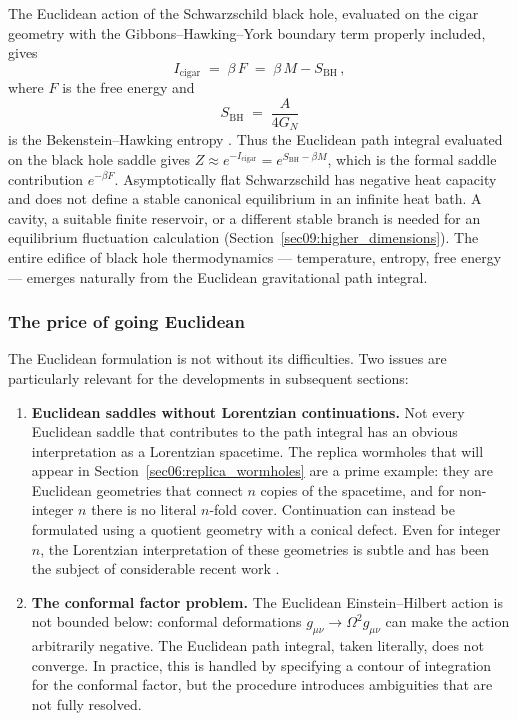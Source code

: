 \documentclass[11pt,letterpaper]{article}
\theoremstyle{plain}
\theoremstyle{definition}
\theoremstyle{remark}
\begin{document}
The Euclidean action of the Schwarzschild black hole, evaluated on the cigar
geometry with the Gibbons--Hawking--York boundary term properly included, gives
\citep{gibbonshawking1977}
\begin{equation}\label{eq05:euclidean_action_bh}
  I_{\mathrm{cigar}} \;=\; \beta\, F \;=\; \beta\, M - S_{\mathrm{BH}}\,,
\end{equation}
where $F$ is the free energy and
\begin{equation}\label{eq05:bh_entropy_from_action}
  S_{\mathrm{BH}} \;=\; \frac{A}{4G_N}
\end{equation}
is the Bekenstein--Hawking entropy \citep{bekenstein1973, hawking1975}.  Thus the
Euclidean path integral evaluated on the black hole saddle gives
$Z \approx e^{-I_{\mathrm{cigar}}} = e^{S_{\mathrm{BH}} - \beta M}$, which is
the formal saddle contribution $e^{-\beta F}$. Asymptotically flat
Schwarzschild has negative heat capacity and does not define a stable
canonical equilibrium in an infinite heat bath. A cavity, a suitable
finite reservoir, or a different stable branch is needed for an equilibrium
fluctuation calculation (Section~\ref{sec09:higher_dimensions}).  The entire edifice of black hole thermodynamics ---
temperature, entropy, free energy --- emerges naturally from the Euclidean
gravitational path integral.

\subsubsection*{The price of going Euclidean}

The Euclidean formulation is not without its difficulties.  Two issues are
particularly relevant for the developments in subsequent sections:

\begin{enumerate}
  \item \textbf{Euclidean saddles without Lorentzian continuations.}  Not every
    Euclidean saddle that contributes to the path integral has an obvious
    interpretation as a Lorentzian spacetime.  The replica wormholes that will
    appear in Section~\ref{sec06:replica_wormholes}
    \citep{pssyetal2022, ahmstetal2020} are a prime example: they are
    Euclidean geometries that connect $n$ copies of the spacetime, and for
    non-integer $n$ there is no literal $n$-fold cover. Continuation can
    instead be formulated using a quotient geometry with a conical defect.  Even for integer $n$, the Lorentzian interpretation of
    these geometries is subtle and has been the subject of considerable recent
    work \citep{colinetal2021}.

  \item \textbf{The conformal factor problem.}  The Euclidean Einstein--Hilbert
    action is not bounded below: conformal deformations
    $g_{\mu\nu} \to \Omega^2 g_{\mu\nu}$ can make the action arbitrarily
    negative.  The Euclidean path integral, taken literally, does not converge.
    In practice, this is handled by specifying a contour of integration for the
    conformal factor, but the procedure introduces ambiguities that are not fully
    resolved.
\end{enumerate}
\end{document}
